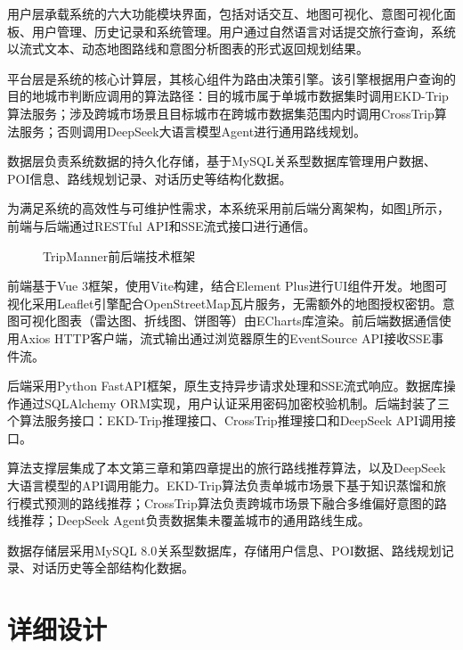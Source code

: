 用户层承载系统的六大功能模块界面，包括对话交互、地图可视化、意图可视化面板、用户管理、历史记录和系统管理。用户通过自然语言对话提交旅行查询，系统以流式文本、动态地图路线和意图分析图表的形式返回规划结果。

平台层是系统的核心计算层，其核心组件为路由决策引擎。该引擎根据用户查询的目的地城市判断应调用的算法路径：目的城市属于单城市数据集时调用EKD-Trip算法服务；涉及跨城市场景且目标城市在跨城市数据集范围内时调用CrossTrip算法服务；否则调用DeepSeek大语言模型Agent进行通用路线规划。

数据层负责系统数据的持久化存储，基于MySQL关系型数据库管理用户数据、POI信息、路线规划记录、对话历史等结构化数据。

为满足系统的高效性与可维护性需求，本系统采用前后端分离架构，如图\ref{fig:ch5_techstack}所示，前端与后端通过RESTful API和SSE流式接口进行通信。

\begin{figure}[hbt]
  \centering
  \caption{TripManner前后端技术框架}
  \label{fig:ch5_techstack}
\end{figure}

前端基于Vue 3框架，使用Vite构建，结合Element Plus进行UI组件开发。地图可视化采用Leaflet引擎配合OpenStreetMap瓦片服务，无需额外的地图授权密钥。意图可视化图表（雷达图、折线图、饼图等）由ECharts库渲染。前后端数据通信使用Axios HTTP客户端，流式输出通过浏览器原生的EventSource API接收SSE事件流。

后端采用Python FastAPI框架，原生支持异步请求处理和SSE流式响应。数据库操作通过SQLAlchemy ORM实现，用户认证采用密码加密校验机制。后端封装了三个算法服务接口：EKD-Trip推理接口、CrossTrip推理接口和DeepSeek API调用接口。

算法支撑层集成了本文第三章和第四章提出的旅行路线推荐算法，以及DeepSeek大语言模型的API调用能力。EKD-Trip算法负责单城市场景下基于知识蒸馏和旅行模式预测的路线推荐；CrossTrip算法负责跨城市场景下融合多维偏好意图的路线推荐；DeepSeek Agent负责数据集未覆盖城市的通用路线生成。

数据存储层采用MySQL 8.0关系型数据库，存储用户信息、POI数据、路线规划记录、对话历史等全部结构化数据。

\section{详细设计}
\label{sec:ch5_detail}

